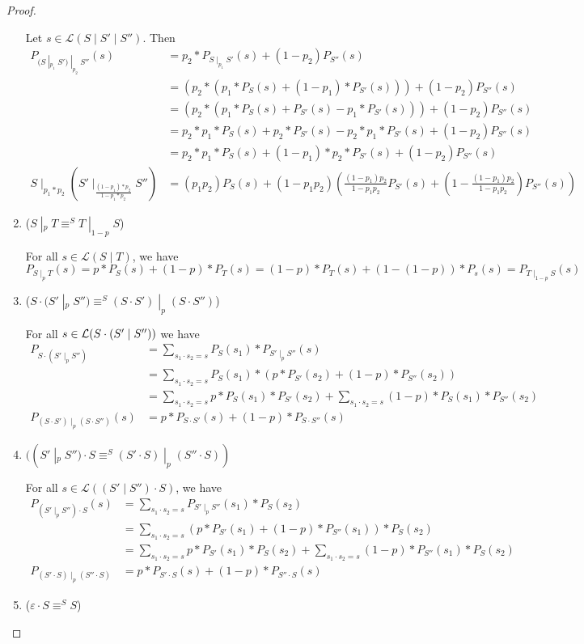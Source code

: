 \documentclass[acmsmall,screen,anonymous]{acmart}
\begin{document}
\begin{proof}
\begin{enumerate}
Let $s \in \mathcal{L}(S \; |\; S' \; | \; S'')$. Then
\begin{align*}
P_{(S \; |_{p_1} \; S') \; |_{p_2} \; S''}(s) &= p_2 * P_{S \; |_{p_1} \; S'}(s) + (1-p_2)P_{S''}(s)\\
&= (p_2 * (p_1 * P_S(s) + (1-p_1) * P_{S'}(s))) + (1-p_2)P_{S''}(s)\\
&= (p_2 * (p_1 * P_S(s) + P_{S'}(s)-p_1* P_{S'}(s))) + (1-p_2)P_{S''}(s)\\
&= p_2*p_1 * P_S(s) + p_2*P_{S'}(s)-p_2*p_1* P_{S'}(s) + (1-p_2)P_{S''}(s)\\
&= p_2*p_1 * P_S(s) + (1-p_1) * p_2 * P_{S'}(s)+ (1-p_2)P_{S''}(s)\\
S \; |_{p_1 * p_2} \; (S' \; |_{\frac{(1-p_1)*p_2}{1-p_1*p_2}} \; S'') &= (p_1p_2)  P_S(s) + (1-p_1p_2)  \left(\frac{(1-p_1)p_2}{1-p_1p_2}  P_{S'}(s) + \left(1-\frac{(1-p_1)p_2}{1-p_1p_2}\right)P_{S''}(s)\right)
\end{align*}
\item
($S \; |_p \; T \equiv^S T \; |_{1-p} \; S$)

For all $s \in \mathcal{L}(S \; | \; T)$, we have
$$P_{S \; |_p \; T}(s) = p*P_S(s) + (1-p)*P_T(s) = (1-p) * P_T(s) + (1-(1-p))*P_s(s) = P_{T \; |_{1-p} \; S}(s)$$
\item
($S \cdot (S' \; |_p \; S'' ) \equiv^S (S \cdot S') \; |_p \; (S \cdot S'')$)

For all $s \in \mathcal{L}(S \cdot (S' \; | \; S''))$ we have
\begin{align*}
P_{S \cdot (S' \; |_p \; S'' )} &= \sum_{s_1 \cdot s_2 = s}P_S(s_1) * P_{S' \; |_p \; S''}(s)\\
&= \sum_{s_1 \cdot s_2 = s}P_S(s_1) * (p * P_{S'}(s_2) + (1-p) * P_{S''}(s_2))\\
&= \sum_{s_1 \cdot s_2 = s}p * P_S(s_1) * P_{S'}(s_2) + \sum_{s_1 \cdot s_2 = s}(1-p) * P_S(s_1) * P_{S''}(s_2)\\
P_{(S \cdot S') \; |_p \; (S \cdot S'')}(s) &= p*P_{S \cdot S'}(s) + (1-p)*P_{S \cdot S''}(s)
\end{align*}
\item
$((S' \; |_p \; S'') \cdot S \equiv^S (S' \cdot S) \; |_p \; (S'' \cdot S))$

For all $s \in \mathcal{L}((S' \; | \; S'') \cdot S)$,  we have
\begin{align*}
P_{(S' \; |_p \; S'') \cdot S}(s) &= \sum_{s_1 \cdot s_2 = s}P_{S' \; |_p \; S''}(s_1) * P_S(s_2)\\
&= \sum_{s_1 \cdot s_2 = s}(p * P_{S'}(s_1) + (1-p) * P_{S''}(s_1))* P_S(s_2)\\
&= \sum_{s_1 \cdot s_2=s}p*P_{S'}(s_1) * P_S(s_2) + \sum_{s_1 \cdot s_2 = s}(1-p) * P_{S''}(s_1) * P_S(s_2)\\
P_{(S' \cdot S) \; |_p \; (S'' \cdot S)}&= p * P_{S' \cdot S}(s) + (1-p) * P_{S'' \cdot S}(s)
\end{align*}
\item
($\varepsilon \cdot S \equiv^S S$)


\end{enumerate}
\end{proof}
\end{document}
